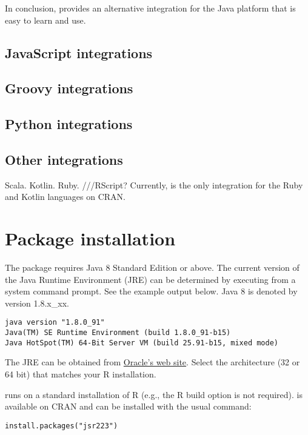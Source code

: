 In conclusion,  provides an alternative integration for the Java platform that is easy to learn and use.

\subsection{JavaScript integrations}

\subsection{Groovy integrations}

\subsection{Python integrations}

\subsection{Other integrations}
Scala. Kotlin. Ruby. ///RScript?
Currently,  is the only integration for the Ruby and Kotlin languages on CRAN.%

\section{Package installation}

The  package requires Java 8 Standard Edition or above. The current version of the Java Runtime Environment (JRE) can be determined by executing  from a system command prompt. See the example output below. Java 8 is denoted by version 1.8.x\_xx.

\begin{verbatim}
java version "1.8.0_91"
Java(TM) SE Runtime Environment (build 1.8.0_91-b15)
Java HotSpot(TM) 64-Bit Server VM (build 25.91-b15, mixed mode)
\end{verbatim}

The JRE can be obtained from  \href{http://www.oracle.com/technetwork/java/javase/downloads/jre8-downloads-2133155.html}{Oracle's web site}. Select the architecture (32 or 64 bit) that matches your R installation.

 runs on a standard installation of R (e.g., the R build option  is not required).  is available on CRAN and can be installed with the usual command:

\begin{verbatim}
install.packages("jsr223")
\end{verbatim}

